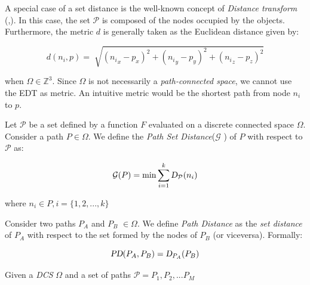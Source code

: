 \documentclass[graybox]{svmult}
\newcommand{\PathSet}{\ensuremath{\mathcal P} }
\newcommand{\PathSetDistance}{\ensuremath{\mathcal G} }
\newcommand{\Z}{\mathbb{Z} }
\newcommand{\Path}{\ensuremath{P} }
\newcommand{\DCS}{\ensuremath{\Omega} }
\newcommand{\SetDistance}{\textsl{D} }
\newcommand{\PathDistance}{\textsl{PD} }
\begin{document}
A special case of a set distance is the well-known concept of \emph{ Distance transform} (\cite{Fabbri2008Survey2DEDT},\cite{Jones2006Survey3DDT}). In this case, the set \PathSet is composed of the nodes occupied by the objects. Furthermore, the metric $d$ is generally taken as the Euclidean distance given by:

\[ d(n_{i}, p) = \sqrt[]{ ( {n_{i}}_{x} - p_{x})^{2} + ({n_{i}}_{y} - p_{y})^{2} + ({n_{i}}_{z} - p_{z})^{2} } \]

when $\Omega \in \Z^{3}$. Since $\Omega$ is not necessarily a \emph{path-connected space}, we cannot use the EDT as metric. An intuitive metric would be the shortest path from node $n_{i}$ to $p$.

\begin{definition}
Let \PathSet be a set defined by a function $F$ evaluated on a discrete connected space $\Omega$. Consider a path $\Path \in \Omega$. We define the \emph{Path Set Distance}(\PathSetDistance) of \Path with respect to \PathSet as: 

\begin{equation}
\PathSetDistance(\Path) = \min \sum_{i = 1}^{k} \textsl{D}_{\PathSet}(n_{i})
\end{equation} 

where $n_{i} \in P, i = \{1,2,...,k\}$
\end{definition}

\begin{definition}
Consider two paths $\Path_{A}$ and $\Path_{B}$ $\in \DCS$. We define \emph{Path Distance} as the \emph{set distance} of $\Path_{A}$ with respect to the set formed by the nodes of $\Path_{B}$ (or viceversa). Formally:

\begin{equation}
\PathDistance(\Path_{A}, \Path_{B}) = \SetDistance_{P_{A}}(P_{B})
\end{equation}
\end{definition}

\begin{definition}
Given a \emph{DCS} $\DCS$ and a set of paths $\PathSet = {\Path_{1}, \Path_{2},...\Path_{M}}$ 
\end{definition}



\end{document}
